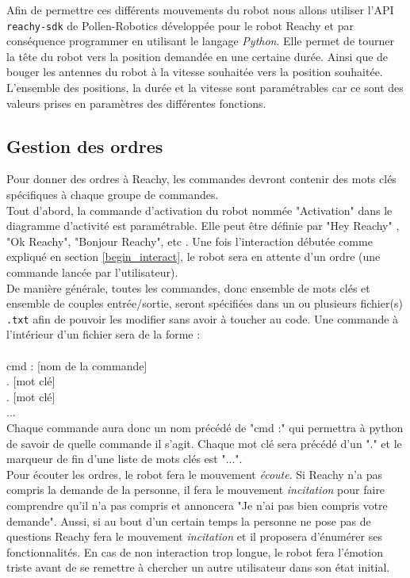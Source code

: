 Afin de permettre ces différents mouvements du robot nous allons utiliser l'API \texttt{reachy-sdk} de Pollen-Robotics développée pour le robot Reachy et par conséquence programmer en utilisant le langage \textit{Python}. Elle permet de tourner la tête du robot vers la position demandée en une certaine durée. Ainsi que de bouger les antennes du robot à la vitesse souhaitée vers la position souhaitée. L'ensemble des positions, la durée et la vitesse sont paramétrables car ce sont des valeurs prises en paramètres des différentes fonctions. \\

\subsection{Gestion des ordres}
Pour donner des ordres à Reachy, les commandes devront contenir des mots clés spécifiques à chaque groupe de commandes. \\

Tout d'abord, la commande d'activation du robot nommée "Activation" dans le diagramme d'activité est paramétrable. Elle peut être définie par "Hey Reachy" , "Ok Reachy", "Bonjour Reachy", etc . Une fois l'interaction débutée comme expliqué en section \ref{begin_interact}, le robot sera en attente d'un ordre (une commande lancée par l'utilisateur). \\

De manière générale, toutes les commandes, donc ensemble de mots clés et ensemble de couples entrée/sortie, seront spécifiées dans un ou plusieurs fichier(s) \texttt{.txt} afin de pouvoir les modifier sans avoir à toucher au code. Une commande à l'intérieur d'un fichier sera de la forme : \\
\ \\
cmd : [nom de la commande] \\
. [mot clé]\\
. [mot clé]\\
...\\

Chaque commande aura donc un nom précédé de "cmd :" qui permettra à python de savoir de quelle commande il s'agit. Chaque mot clé sera précédé d'un "." et le marqueur de fin d'une liste de mots clés est "...". \\

Pour écouter les ordres, le robot fera le mouvement \textit{écoute}. Si Reachy n'a pas compris la demande de la personne, il fera le mouvement \textit{incitation} pour faire comprendre qu'il n'a pas compris et annoncera "Je n'ai pas bien compris votre demande". Aussi, si au bout d'un certain temps la personne ne pose pas de questions Reachy fera le mouvement \textit{incitation} et il proposera d'énumérer ses fonctionnalités. En cas de non interaction trop longue, le robot fera l'émotion triste avant de se remettre à chercher un autre utilisateur dans son état initial. \\

